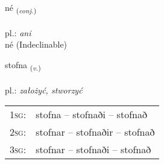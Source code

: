 \documentclass[frontgrid, backgrid]{flacards}\usepackage[]{graphicx}\usepackage[]{xcolor}
\begin{document}
\renewcommand{\blhead}{\vskip5pt {\small\bfseries\footnotesize Samtenging | Conjuction }}
\renewcommand{\bcfoot}{\vskip5pt \hspace{2pt}{\small\bfseries\footnotesize 1K}}


{né \small{\textsubscript{(\textit{conj.})}} \\[1ex]
\textphonetic{[njɛː]} \\
pl.: \emph{ani} \\  [2ex]
né (Indeclinable)}

\renewcommand{\flhead}{\vskip5pt \fboxsep=0pt {\small\bfseries\footnotesize Sagnorð | Verb}}
\renewcommand{\fcfoot}{\vskip5pt \fboxsep=0pt \hspace{2pt}{\small\bfseries\footnotesize 1K}}

\renewcommand{\blhead}{\vskip5pt {\small\bfseries\footnotesize Sagnorð | Verb }}
\renewcommand{\bcfoot}{\vskip5pt \hspace{2pt}{\small\bfseries\footnotesize 1K}}


{stofna \small{\textsubscript{(\textit{v.})}} \\[1ex] %
\textphonetic{[stɔpna]} \\
pl.: \emph{założyć, stworzyć} \\  [2ex]
\renewcommand*{\arraystretch}{0.8}
\begin{tabular}{p{1cm}l}
\textsc{1sg}: & stofna -- stofnaði -- stofnað \\ 
\textsc{2sg}: & stofnar -- stofnaðir -- stofnað \\ 
\textsc{3sg}: & stofnar -- stofnaði -- stofnað \\ 
\end{tabular}
}

\renewcommand{\flhead}{\vskip5pt \fboxsep=0pt {\small\bfseries\footnotesize Lýsingarorð | Adjective}}
\renewcommand{\fcfoot}{\vskip5pt \fboxsep=0pt \hspace{2pt}{\small\bfseries\footnotesize 1K}}

\renewcommand{\blhead}{\vskip5pt {\small\bfseries\footnotesize Lýsingarorð | Adjective }}
\renewcommand{\bcfoot}{\vskip5pt \hspace{2pt}{\small\bfseries\footnotesize 1K}}
\end{document}
